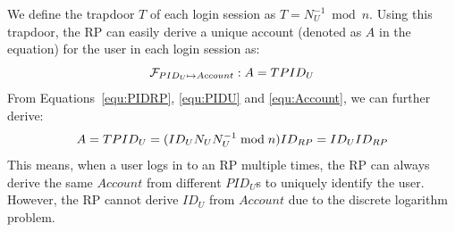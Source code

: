  We define the trapdoor $T$ of each login session as $T = N_U^{-1} \bmod n$. 
Using this trapdoor, the RP can easily derive a unique account (denoted as $A$ in the equation) for the user in each login session as:%
\begin{equation}
\setlength{\abovedisplayskip}{3pt}
\setlength{\belowdisplayskip}{3pt}
   \mathcal{F}_{PID_{U} \mapsto Account}: A = {T}{PID_U}
   \label{equ:Account}
\end{equation}
From Equations~\ref{equ:PIDRP}, \ref{equ:PIDU} and \ref{equ:Account}, we can further derive:
\begin{equation*}
\setlength{\abovedisplayskip}{3pt}
\setlength{\belowdisplayskip}{3pt}
   A =  {T}{PID_{U}}
   = {(ID_U N_U N_U^{-1} \bmod n)}{ID_{RP}}
   = {ID_U}{ID_{RP}}
   \label{equ:AccountNotChanged}
\end{equation*}
This means, when a user logs in to an RP multiple times, the RP can always derive the same $Account$ from different $PID_U$s to uniquely identify the user. However, the RP cannot derive $ID_U$ from $Account$ due to the discrete logarithm problem. 


